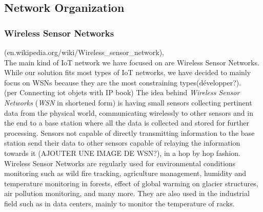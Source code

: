 \subsection{Network Organization}

\subsubsection{Wireless Sensor Networks}

(en.wikipedia.org/wiki/Wireless\_sensor\_network),\\

The main kind of IoT network we have focused on are Wireless Sensor Networks. While our solution fits most types of IoT networks, we have decided to mainly focus on WSNs because they are the most constraining types(développer?).\\

(per Connecting iot objets with IP book)
The idea behind \textit{Wireless Sensor Networks} (\textit{WSN} in shortened form) is having small sensors collecting pertinent data from the physical world, communicating wirelessly to other sensors and in the end to a base station where all the data is collected and stored for further processing. Sensors not capable of directly transmitting information to the base station send their data to other sensors capable of relaying the information towards it (AJOUTER UNE IMAGE DE WSN?), in a hop by hop fashion.\\

Wireless Sensor Networks are regularly used for environmental conditions monitoring such as wild fire tracking, agriculture management, humidity and temperature monitoring in forests, effect of global warming on glacier structures, air pollution monitoring, and many more. They are also used in the industrial field such as in data centers, mainly to monitor the temperature of racks.  \\

